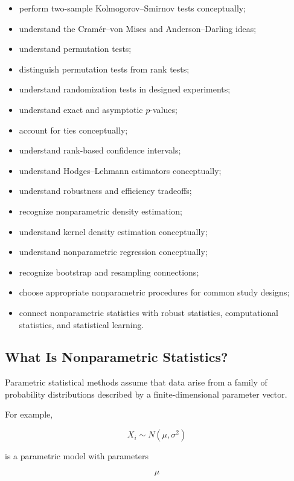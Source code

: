 {\begin{itemize}
    \item perform two-sample Kolmogorov--Smirnov tests conceptually;
    \item understand the Cramér--von Mises and Anderson--Darling ideas;
    \item understand permutation tests;
    \item distinguish permutation tests from rank tests;
    \item understand randomization tests in designed experiments;
    \item understand exact and asymptotic \(p\)-values;
    \item account for ties conceptually;
    \item understand rank-based confidence intervals;
    \item understand Hodges--Lehmann estimators conceptually;
    \item understand robustness and efficiency tradeoffs;
    \item recognize nonparametric density estimation;
    \item understand kernel density estimation conceptually;
    \item understand nonparametric regression conceptually;
    \item recognize bootstrap and resampling connections;
    \item choose appropriate nonparametric procedures for common study
          designs;
    \item connect nonparametric statistics with robust statistics,
          computational statistics, and statistical learning.
\end{itemize}
}

\subsection{What Is Nonparametric Statistics?}
\label{subsec:what-is-nonparametric-statistics}

Parametric statistical methods assume that data arise from a family of
probability distributions described by a finite-dimensional parameter
vector.

For example,

\[
\boxed{
X_i
\sim
N(\mu,\sigma^2)
}
\]

is a parametric model with parameters

\[
\mu
\]

